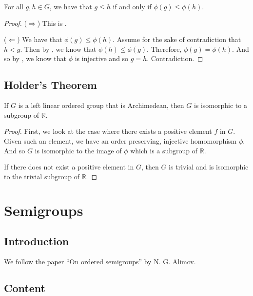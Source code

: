 \begin{theorem}\label{strict_order_preserving_phi}
    \leanok
    For all $g,h \in G$, we have that
    $g \le h$ if and only if $\phi(g) \le \phi(h)$.
\end{theorem}
\begin{proof}\leanok
($\Rightarrow$) This is .

($\Leftarrow$) We have that $\phi(g) \le \phi(h)$.
Assume for the sake of contradiction that $h < g$.
Then by , we know that
$\phi(h) \le \phi(g)$. Therefore, $\phi(g) = \phi(h)$.
And so by , we know that $\phi$ is injective and
so $g = h$. Contradiction.
\end{proof}

\section{Holder's Theorem}
\begin{theorem}\label{holders_theorem}
    \leanok
    If $G$ is a left linear ordered group that is Archimedean,
    then $G$ is isomorphic to a subgroup of $\mathbb{R}$.
\end{theorem}
\begin{proof}\leanok
First, we look at the case where there exists a positive element $f$ in $G$.
Given such an element, we have an order preserving, injective homomorphism
$\phi$. And so $G$ is isomorphic to the image of $\phi$ which is a subgroup of $\mathbb{R}$.

If there does not exist a positive element in $G$,
then $G$ is trivial and is isomorphic to the trivial subgroup of
$\mathbb{R}$.
\end{proof}

\chapter{Semigroups}
\section{Introduction}
We follow the paper ``On ordered semigroups'' by
N. G. Alimov.

\section{Content}

